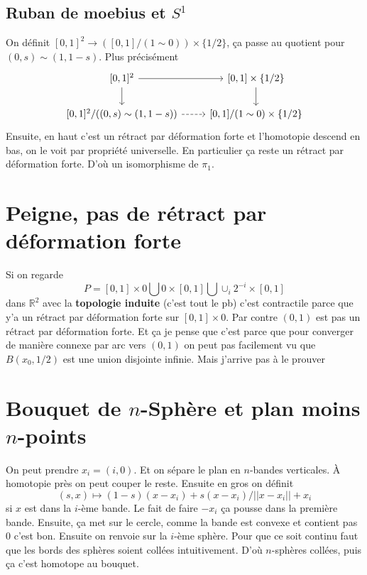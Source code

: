 \documentclass[a4paper,12pt]{book}
\newcommand{\R}{\mathbb{R}}
\theoremstyle{plain}
\theoremstyle{definition}
\theoremstyle{remark}
\begin{document}
\subsection{Ruban de moebius et $S^1$}
On définit $[0,1]^2\to ([0,1]/(1\sim 0))\times \{1/2\}$, ça passe
au quotient pour $(0,s)\sim (1,1-s)$. Plus précisément
\[\begin{tikzcd}
	{[0,1]^2} & {[0,1]\times\{1/2\}} \\
	{[0,1]^2/((0,s)\sim(1,1-s))} & {[0,1]/(1\sim 0)\times\{1/2\}}
	\arrow[from=1-1, to=1-2]
	\arrow[from=1-1, to=2-1]
	\arrow[from=1-2, to=2-2]
	\arrow[dashed, from=2-1, to=2-2]
\end{tikzcd}\]
Ensuite, en haut c'est un rétract par déformation forte et 
l'homotopie descend en bas, on le voit par propriété universelle.
En particulier ça reste un rétract par déformation forte. D'où
un isomorphisme de $\pi_1$.

\section{Peigne, pas de rétract par déformation forte}
Si on regarde 
\[P=[0,1]\times 0\bigcup 0\times [0,1]\bigcup\cup_i 2^{-i}\times [0,1]\]
dans $\R^2$ avec la \textbf{topologie induite} (c'est tout le pb)
c'est contractile parce que y'a un rétract par déformation
forte sur $[0,1]\times 0$. Par contre $(0,1)$ est pas un
rétract par déformation forte. Et ça je pense que c'est parce que
pour converger de manière connexe par arc vers $(0,1)$ on peut pas
facilement vu que $B(x_0,1/2)$ est une union disjointe infinie.
Mais j'arrive pas à le prouver
\section{Bouquet de $n$-Sphère et plan moins $n$-points}
On peut prendre $x_i=(i,0)$. Et on sépare le plan en $n$-bandes
verticales. À homotopie près on peut couper le reste. Ensuite
en gros on définit 
\[(s,x)\mapsto (1-s)(x-x_i)+s(x-x_i)/||x-x_i||+x_i\]
si $x$ est dans la $i$-ème bande. Le fait de faire $-x_i$ ça
pousse dans la première bande. Ensuite, ça met sur le cercle,
comme la bande est convexe et contient pas $0$ c'est bon. Ensuite
on renvoie sur la $i$-ème sphère. Pour que ce soit continu faut
que les bords des sphères soient collées intuitivement. D'où
$n$-sphères collées, puis ça c'est homotope au bouquet.
\end{document}
